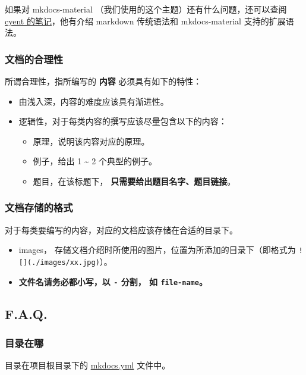 如果对 mkdocs-material （我们使用的这个主题）还有什么问题，还可以查阅 \href{https://cyent.github.io/markdown-with-mkdocs-material/}{cyent 的笔记}，他有介绍 markdown 传统语法和 mkdocs-material 支持的扩展语法。

\subsubsection{文档的合理性}

所谓合理性，指所编写的 \textbf{内容} 必须具有如下的特性：

\begin{itemize}
\item 由浅入深，内容的难度应该具有渐进性。
\item 逻辑性，对于每类内容的撰写应该尽量包含以下的内容：
\begin{itemize}
\item 原理，说明该内容对应的原理。
\item 例子，给出 1 \textasciitilde{} 2 个典型的例子。
\item 题目，在该标题下， \textbf{只需要给出题目名字、题目链接}。
\end{itemize}
\end{itemize}

\subsubsection{文档存储的格式}

对于每类要编写的内容，对应的文档应该存储在合适的目录下。

\begin{itemize}
\item images， 存储文档介绍时所使用的图片，位置为所添加的目录下（即格式为 \texttt{![](./images/xx.jpg)}）。
\item \textbf{文件名请务必都小写，以 \texttt{-} 分割， 如 \texttt{file-name}。}
\end{itemize}

\subsection{F.A.Q.}

\subsubsection{目录在哪}

目录在项目根目录下的 \href{https://github.com/24OI/OI-wiki/blob/master/mkdocs.yml#L17}{mkdocs.yml} 文件中。

